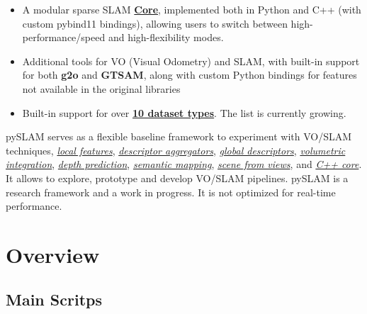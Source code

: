 \documentclass{article}
\begin{document}
\begin{itemize}
    \item A modular sparse SLAM \textbf{\protect\hyperlink{cpp-core}{Core}}, implemented both in Python and C++ (with custom pybind11 bindings), allowing users to switch between high-performance/speed and high-flexibility modes.
    
    \item Additional tools for VO (Visual Odometry) and SLAM, with built-in
    support for both \textbf{g2o}\cite{g2o_kummerle} and \textbf{GTSAM}\cite{factor_graphs_for_robot_perception}, along with custom
    Python bindings for features not available in the original libraries

    \item Built-in support for over \textbf{\protect\hyperlink{datasets}{10 dataset
    types}}. The list is currently growing.
\end{itemize}

pySLAM serves as a flexible baseline framework to experiment with VO/SLAM
techniques, \emph{\protect\hyperlink{supported-local-features}{local
features}},
\emph{\protect\hyperlink{supported-global-descriptors-and-local-descriptor-aggregation-methods}{descriptor
aggregators}},
\emph{\protect\hyperlink{supported-global-descriptors-and-local-descriptor-aggregation-methods}{global
descriptors}},
\emph{\protect\hyperlink{volumetric-reconstruction-pipeline}{volumetric
integration}}, \emph{\protect\hyperlink{depth-prediction}{depth
prediction}}, \emph{\protect\hyperlink{semantic-mapping}{semantic
mapping}}, \emph{\protect\hyperlink{scene-from-views}{scene from views}}, and \emph{\protect\hyperlink{cpp-core}{C++ core}}. It allows to explore, prototype and develop VO/SLAM
pipelines. pySLAM is a research framework and a work in progress. It is
not optimized for real-time performance.


\hypertarget{system_overview}{%
\section{Overview}}

\subsection{Main Scritps}
\end{document}
